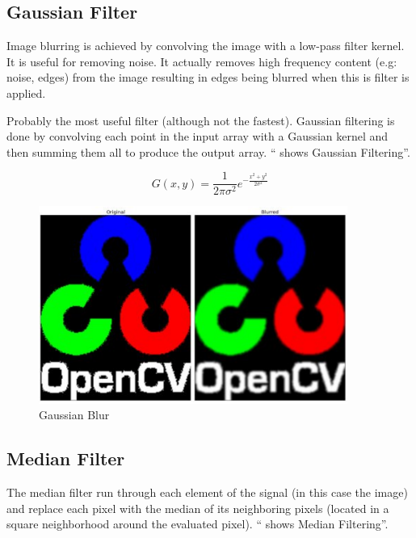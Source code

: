 \subsection{Gaussian Filter}
Image blurring is achieved by convolving the image with a low-pass filter kernel. It is useful for removing noise. It
actually removes high frequency content (e.g: noise, edges) from the image resulting in edges being blurred when this
is filter is applied.

Probably the most useful filter (although not the fastest). Gaussian filtering is done by convolving each point in the input array with a Gaussian kernel and then summing them all to produce the output array. `` shows Gaussian Filtering''.

\begin{equation}
G(x,y) = \frac{1}{2 \pi \sigma ^{2}} e^{- \frac{x^{2} + y^{2}}{2 \sigma ^{2}}}
\label{2dgaussian}
\end{equation}

\vspace{50pt}
\begin{figure}[H]
  \centering
  \includegraphics[width=0.9\textwidth]{figures/Gaussian}
  \caption{Gaussian Blur}
  \label{fig:Gaussian}
\end{figure}

\subsection{Median Filter}

The median filter run through each element of the signal (in this case the image) and replace each pixel with the median of its neighboring pixels (located in a square neighborhood around the evaluated pixel). `` shows Median Filtering''.

